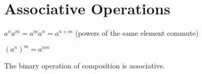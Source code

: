 
\chapter{Associative Operations}


\begin{lemma}
	$a^na^m = a^ma^n = a^{n+m}$ (powers of the same element commute)
\end{lemma}

\begin{lemma}
	$(a^n)^m = a^{nm}$
\end{lemma}

\begin{lemma}
	The binary operation of composition is associative.
\end{lemma}
